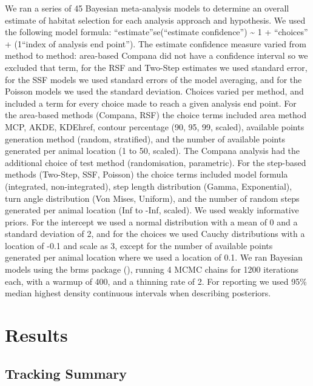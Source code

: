 \documentclass[10pt,a4paper]{article}
\begin{document}
We ran a series of 45 Bayesian meta-analysis models to determine an overall estimate of habitat selection for each analysis approach and hypothesis.
We used the following model formula: ``estimate''\textbar se(``estimate confidence'') \textasciitilde{} 1 + ``choices'' + (1\textbar{}``index of analysis end point'').
The estimate confidence measure varied from method to method: area-based Compana did not have a confidence interval so we excluded that term, for the RSF and Two-Step estimates we used standard error, for the SSF models we used standard errors of the model averaging, and for the Poisson models we used the standard deviation.
Choices varied per method, and included a term for every choice made to reach a given analysis end point.
For the area-based methods (Compana, RSF) the choice terms included area method MCP, AKDE, KDEhref, contour percentage (90, 95, 99, scaled), available points generation method (random, stratified), and the number of available points generated per animal location (1 to 50, scaled).
The Compana analysis had the additional choice of test method (randomisation, parametric).
For the step-based methods (Two-Step, SSF, Poisson) the choice terms included model formula (integrated, non-integrated), step length distribution (Gamma, Exponential), turn angle distribution (Von Mises, Uniform), and the number of random steps generated per animal location (Inf to -Inf, scaled).
We used weakly informative priors.
For the intercept we used a normal distribution with a mean of 0 and a standard deviation of 2, and for the choices we used Cauchy distributions with a location of -0.1 and scale as 3, except for the number of available points generated per animal location where we used a location of 0.1.
We ran Bayesian models using the brms package (), running 4 MCMC chains for 1200 iterations each, with a warmup of 400, and a thinning rate of 2.
For reporting we used 95\% median highest density continuous intervals when describing posteriors.

\section{Results}\label{results}

\subsection{Tracking Summary}\label{tracking-summary}
\end{document}
